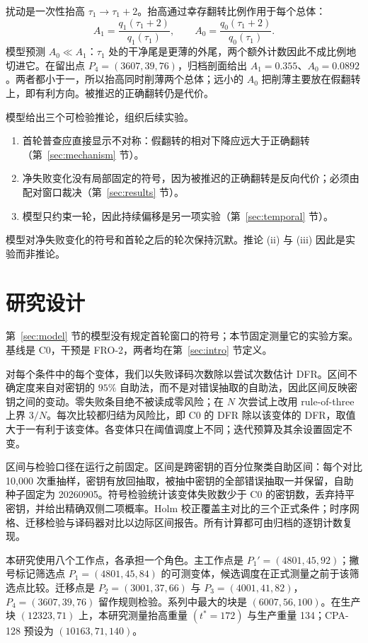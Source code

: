 \documentclass[UTF8,a4paper,10pt,onecolumn]{ctexart}
\begin{document}
扰动是一次性抬高 $\tau_1\to\tau_1+2$。抬高通过幸存翻转比例作用于每个总体：
\begin{equation}\label{eq:multipliers}
A_1=\frac{q_1(\tau_1+2)}{q_1(\tau_1)},\qquad
A_0=\frac{q_0(\tau_1+2)}{q_0(\tau_1)} .
\end{equation}
模型预测 $A_0\ll A_1$：$\tau_1$ 处的干净尾是更薄的外尾，两个额外计数因此不成比例地切进它。在留出点 $P_4=(3607,39,76)$，归档剖面给出 $A_1 = 0.355$、$A_0 = 0.0892$。两者都小于一，所以抬高同时削薄两个总体；远小的 $A_0$ 把削薄主要放在假翻转上，即有利方向。被推迟的正确翻转仍是代价。

模型给出三个可检验推论，组织后续实验。
\begin{enumerate}[label=(\roman*),leftmargin=*,itemsep=1pt,topsep=2pt]
\item 首轮普查应直接显示不对称：假翻转的相对下降应远大于正确翻转（第~\ref{sec:mechanism} 节）。
\item 净失败变化没有局部固定的符号，因为被推迟的正确翻转是反向代价；必须由配对窗口裁决（第~\ref{sec:results} 节）。
\item 模型只约束一轮，因此持续偏移是另一项实验（第~\ref{sec:temporal} 节）。
\end{enumerate}
模型对净失败变化的符号和首轮之后的轮次保持沉默。推论 (ii) 与 (iii) 因此是实验而非推论。
\section{研究设计}\label{sec:method}

第~\ref{sec:model} 节的模型没有规定首轮窗口的符号；本节固定测量它的实验方案。基线是 C0，干预是 FRO-2，两者均在第~\ref{sec:intro} 节定义。

对每个条件中的每个变体，我们以失败译码次数除以尝试次数估计 DFR。区间不确定度来自对密钥的 $95\%$ 自助法，而不是对错误抽取的自助法，因此区间反映密钥之间的变动。零失败条目绝不被读成零风险；在 $N$ 次尝试上改用 rule-of-three 上界 $3/N$。每次比较都归结为风险比，即 C0 的 DFR 除以该变体的 DFR，取值大于一有利于该变体。各变体只在阈值调度上不同；迭代预算及其余设置固定不变。

区间与检验口径在运行之前固定。区间是跨密钥的百分位聚类自助区间：每个对比 10{,}000 次重抽样，密钥有放回抽取，被抽中密钥的全部错误抽取一并保留，自助种子固定为 20260905。符号检验统计该变体失败数少于 C0 的密钥数，丢弃持平密钥，并给出精确双侧二项概率。Holm 校正覆盖主对比的三个正式条件；时序网格、迁移检验与译码器对比以边际区间报告。所有计算都可由归档的逐钥计数复现。

本研究使用八个工作点，各承担一个角色。主工作点是 $P_1'=(4801,45,92)$；撇号标记筛选点 $P_1=(4801,45,84)$ 的可测变体，候选调度在正式测量之前于该筛选点比较。迁移点是 $P_2=(3001,37,66)$ 与 $P_3=(4001,41,82)$，$P_4=(3607,39,76)$ 留作规则检验。系列中最大的块是 $(6007,56,100)$。在生产块 $(12323,71)$ 上，本研究测量抬高重量 $(t^{\ast}=172)$ 与生产重量 134；CPA-128 预设为 $(10163,71,140)$。
\end{document}
